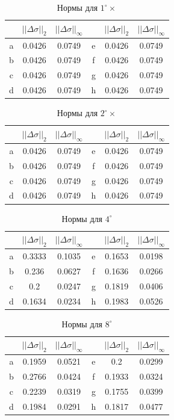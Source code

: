 \documentclass{procDDs}
\begin{document}
\begin{table}[h!]
	\begin{tabular}{|c|c|c||c|c|c|}
		\hline
		& $||\Delta\sigma||_2$ & $||\Delta\sigma||_\infty$ &
		& $||\Delta\sigma||_2$ & $||\Delta\sigma||_\infty$ \\ \hline
		a & 0.0426 & 0.0749 & e &  0.0426 & 0.0749\\ \hline
		b & 0.0426 & 0.0749 & f &  0.0426 & 0.0749\\ \hline
		c & 0.0426 & 0.0749 & g &  0.0426 & 0.0749\\ \hline
		d & 0.0426 & 0.0749 & h &  0.0426 & 0.0749\\ \hline
	\end{tabular}
	\label{table:desc1}
	\caption{Нормы для $1^\circ \times$}
\end{table}
\begin{table}[h!]
	\begin{tabular}{|c|c|c||c|c|c|}
		\hline
		& $||\Delta\sigma||_2$ & $||\Delta\sigma||_\infty$ &
		& $||\Delta\sigma||_2$ & $||\Delta\sigma||_\infty$ \\ \hline
		a & 0.0426 & 0.0749 & e &  0.0426 & 0.0749\\ \hline
		b & 0.0426 & 0.0749 & f &  0.0426 & 0.0749\\ \hline
		c & 0.0426 & 0.0749 & g &  0.0426 & 0.0749\\ \hline
		d & 0.0426 & 0.0749 & h &  0.0426 & 0.0749\\ \hline
	\end{tabular}
	\label{table:desc2}
	\caption{Нормы для $2^\circ \times$}	
\end{table}
\begin{table}[h!]
	\begin{tabular}{|c|c|c||c|c|c|}
		\hline
		& $||\Delta\sigma||_2$ & $||\Delta\sigma||_\infty$ &
		& $||\Delta\sigma||_2$ & $||\Delta\sigma||_\infty$ \\ \hline
		a & 0.3333 & 0.1035 & e &  0.1653 & 0.0198\\ \hline
		b & 0.236 & 0.0627 & f &  0.1636 & 0.0266\\ \hline
		c & 0.2 & 0.0247 & g &  0.1819 & 0.0406\\ \hline
		d & 0.1634 & 0.0234 & h &  0.1983 & 0.0526\\ \hline
	\end{tabular}
	\label{table:desc3}
	\caption{Нормы для $4^\circ$}	
\end{table}
\begin{table}[h!]
	\begin{tabular}{|c|c|c||c|c|c|}
		\hline
		& $||\Delta\sigma||_2$ & $||\Delta\sigma||_\infty$ &
		& $||\Delta\sigma||_2$ & $||\Delta\sigma||_\infty$ \\ \hline
		a & 0.1959 & 0.0521 & e &  0.2 & 0.0299\\ \hline
		b & 0.2766 & 0.0424 & f &  0.1933 & 0.0324\\ \hline
		c & 0.2239 & 0.0319 & g &  0.1755 & 0.0399\\ \hline
		d & 0.1984 & 0.0291 & h &  0.1817 & 0.0477\\ \hline
	\end{tabular}
	\label{table:desc4}
	\caption{Нормы для $8^\circ$}
\end{table}
\end{document}
